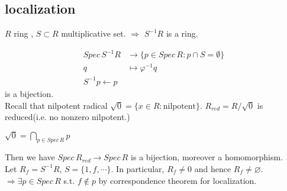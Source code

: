 \subsection{localization}
 $ R  $ ring ,  $ S\subset R  $ multiplicative set.  $ \Rightarrow $  $ S^{-1}R  $ is a ring.
 
 \[
  \begin{aligned}
    Spec\, S^{-1}R&\longrightarrow\{p\in Spec\, R:p\cap S=\emptyset\}\\
    q&\mapsto \varphi^{-1}q\\
    S^{-1}p\leftarrow p
  \end{aligned}
  \]
  is a bijection.\\
Recall that nilpotent radical  $ \sqrt{0}=\{x\in R:\text{nilpotent}\} $.
 $ R_{red}=R/\sqrt{0}  $ is reduced(i.e. no nonzero nilpotent.) 
\begin{theorem}
     $ \sqrt{0}=\bigcap\limits_{p\in Spec\, R}p $ 
\end{theorem}
Then we have  $ Spec\, R_{red}\rightarrow Spec\, R  $ is a bijection, moreover a homomorphism.\\
Let  $ R_f=S^{-1}R,\, S=\{1,f,\cdots\} $.  
In particular,  $ R_f\not=0  $ and hence  $ R_f\not=\varnothing $. $ \Rightarrow \exists p\in Spec\, R    $  s.t.  $ f\not\in p  $ by correspondence theorem for localization.
